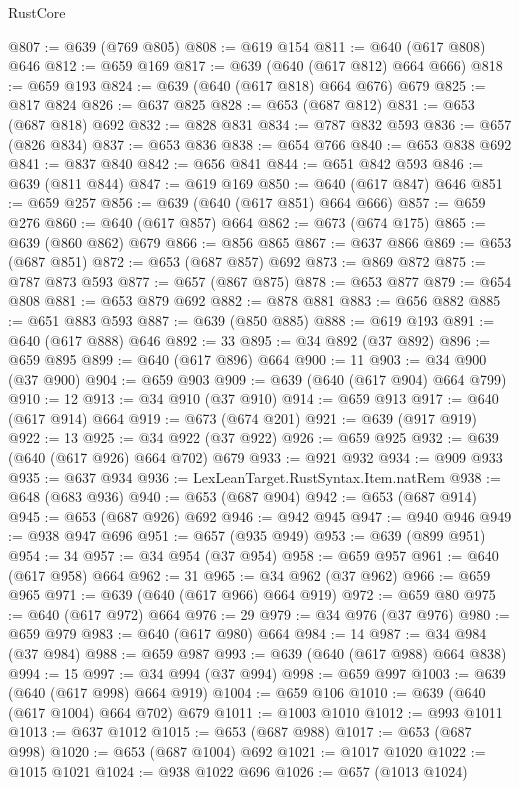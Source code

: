 \begin{lexlean}{RustCore}
\begin{coremodule}
@807 := @639 (@769 @805)
@808 := @619 @154
@811 := @640 (@617 @808) @646
@812 := @659 @169
@817 := @639 (@640 (@617 @812) @664 @666)
@818 := @659 @193
@824 := @639 (@640 (@617 @818) @664 @676) @679
@825 := @817 @824
@826 := @637 @825
@828 := @653 (@687 @812)
@831 := @653 (@687 @818) @692
@832 := @828 @831
@834 := @787 @832 @593
@836 := @657 (@826 @834)
@837 := @653 @836
@838 := @654 @766
@840 := @653 @838 @692
@841 := @837 @840
@842 := @656 @841
@844 := @651 @842 @593
@846 := @639 (@811 @844)
@847 := @619 @169
@850 := @640 (@617 @847) @646
@851 := @659 @257
@856 := @639 (@640 (@617 @851) @664 @666)
@857 := @659 @276
@860 := @640 (@617 @857) @664
@862 := @673 (@674 @175)
@865 := @639 (@860 @862) @679
@866 := @856 @865
@867 := @637 @866
@869 := @653 (@687 @851)
@872 := @653 (@687 @857) @692
@873 := @869 @872
@875 := @787 @873 @593
@877 := @657 (@867 @875)
@878 := @653 @877
@879 := @654 @808
@881 := @653 @879 @692
@882 := @878 @881
@883 := @656 @882
@885 := @651 @883 @593
@887 := @639 (@850 @885)
@888 := @619 @193
@891 := @640 (@617 @888) @646
@892 := 33
@895 := @34 @892 (@37 @892)
@896 := @659 @895
@899 := @640 (@617 @896) @664
@900 := 11
@903 := @34 @900 (@37 @900)
@904 := @659 @903
@909 := @639 (@640 (@617 @904) @664 @799)
@910 := 12
@913 := @34 @910 (@37 @910)
@914 := @659 @913
@917 := @640 (@617 @914) @664
@919 := @673 (@674 @201)
@921 := @639 (@917 @919)
@922 := 13
@925 := @34 @922 (@37 @922)
@926 := @659 @925
@932 := @639 (@640 (@617 @926) @664 @702) @679
@933 := @921 @932
@934 := @909 @933
@935 := @637 @934
@936 := LexLeanTarget.RustSyntax.Item.natRem
@938 := @648 (@683 @936)
@940 := @653 (@687 @904)
@942 := @653 (@687 @914)
@945 := @653 (@687 @926) @692
@946 := @942 @945
@947 := @940 @946
@949 := @938 @947 @696
@951 := @657 (@935 @949)
@953 := @639 (@899 @951)
@954 := 34
@957 := @34 @954 (@37 @954)
@958 := @659 @957
@961 := @640 (@617 @958) @664
@962 := 31
@965 := @34 @962 (@37 @962)
@966 := @659 @965
@971 := @639 (@640 (@617 @966) @664 @919)
@972 := @659 @80
@975 := @640 (@617 @972) @664
@976 := 29
@979 := @34 @976 (@37 @976)
@980 := @659 @979
@983 := @640 (@617 @980) @664
@984 := 14
@987 := @34 @984 (@37 @984)
@988 := @659 @987
@993 := @639 (@640 (@617 @988) @664 @838)
@994 := 15
@997 := @34 @994 (@37 @994)
@998 := @659 @997
@1003 := @639 (@640 (@617 @998) @664 @919)
@1004 := @659 @106
@1010 := @639 (@640 (@617 @1004) @664 @702) @679
@1011 := @1003 @1010
@1012 := @993 @1011
@1013 := @637 @1012
@1015 := @653 (@687 @988)
@1017 := @653 (@687 @998)
@1020 := @653 (@687 @1004) @692
@1021 := @1017 @1020
@1022 := @1015 @1021
@1024 := @938 @1022 @696
@1026 := @657 (@1013 @1024)

\end{coremodule}
\end{lexlean}
